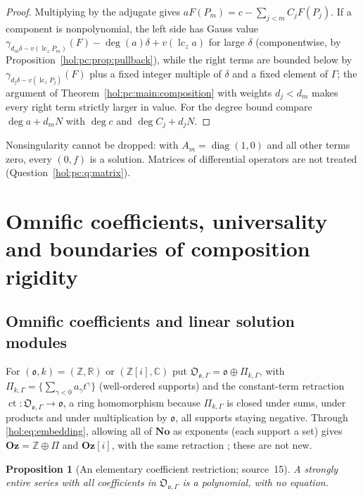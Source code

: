 \documentclass[11pt]{article}
\numberwithin{equation}{section}
\newtheorem{proposition}[theorem]{Proposition}
\theoremstyle{definition}
\theoremstyle{remark}
\newcommand{\C}{\mathbb C}
\newcommand{\R}{\mathbb R}
\newcommand{\Z}{\mathbb Z}
\newcommand{\No}{\mathbf{No}}
\newcommand{\lc}{\operatorname{lc}}
\newcommand{\Oz}{\mathbf{Oz}}
\begin{document}
\begin{proof}
Multiplying by the adjugate gives $aF(P_m)=c-\sum_{j<m}C_jF(P_j)$. If a component
is nonpolynomial, the left side has Gauss value
$\gamma_{d_m\delta-v(\lc_z P_m)}(F)-\deg(a)\delta+v(\lc_z a)$ for large $\delta$
(componentwise, by Proposition~\ref{hol:pc:prop:pullback}), while the right
terms are bounded below by $\gamma_{d_j\delta-v(\lc_z P_j)}(F)$ plus a fixed
integer multiple of $\delta$ and a fixed element of $\Gamma$; the argument of
Theorem~\ref{hol:pc:main:composition} with weights $d_j<d_m$ makes every right
term strictly larger in value. For the degree bound compare $\deg a+d_mN$ with
$\deg c$ and $\deg C_j+d_jN$.
\end{proof}

Nonsingularity cannot be dropped: with $A_m=\operatorname{diag}(1,0)$ and all
other terms zero, every $(0,f)$ is a solution. Matrices of differential
operators are not treated (Question~\ref{hol:pc:q:matrix}).

\section{Omnific coefficients, universality and boundaries of composition
rigidity}\label{hol:pc:sec:arithmetic}

\subsection{Omnific coefficients and linear solution modules}
\label{hol:pc:sub:omnific}

For $(\mathfrak o,k)=(\Z,\R)$ or $(\Z[i],\C)$ put $\mathfrak O_{\mathfrak
o,\Gamma}=\mathfrak o\oplus\Pi_{k,\Gamma}$, with
$\Pi_{k,\Gamma}=\{\sum_{\gamma<0}a_\gamma t^\gamma\}$ (well-ordered supports) and
the constant-term retraction $\operatorname{ct}:\mathfrak O_{\mathfrak
o,\Gamma}\to\mathfrak o$, a ring homomorphism because $\Pi_{k,\Gamma}$ is closed
under sums, under products and under multiplication by $\mathfrak o$, all
supports staying negative. Through \eqref{hol:eq:embedding}, allowing all of $\No$ as exponents
(each support a set) gives $\Oz=\Z\oplus\Pi$ and $\Oz[i]$, with the same
retraction \cite{repoodg,lmfactor}; these are not new.

\begin{proposition}[An elementary coefficient restriction; source~15]
\label{hol:pc:prop:ompoly}
A strongly entire series with all coefficients in $\mathfrak O_{\mathfrak
o,\Gamma}$ is a polynomial, with no equation.
\end{proposition}
\end{document}
